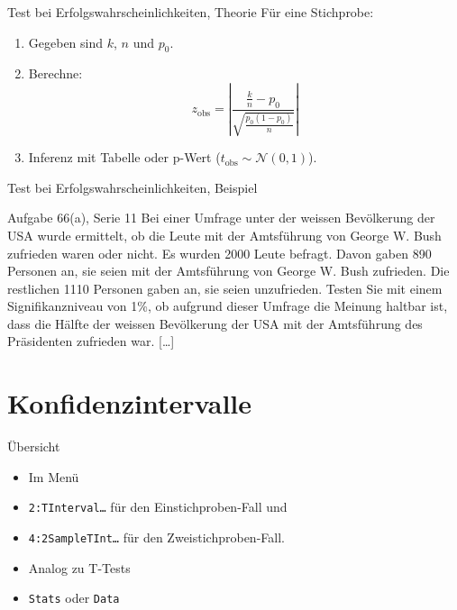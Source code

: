 \documentclass[handout]{beamer}
\newlength{\tikey}
\newcommand{\keystroke}[1]{\settowidth{\tikey}{\scriptsize #1}\psframebox[framearc=0.2]{\parbox{\tikey}{\scriptsize #1}}}
\begin{document}
\begin{frame}{Test bei Erfolgswahrscheinlichkeiten, Theorie}
Für eine Stichprobe:
\begin{enumerate}
\item Gegeben sind $k$, $n$ und $p_0$.
\item Berechne: 
$$
z_\text{obs}=\left| \frac{\frac{k}{n}-p_0}{\sqrt{\frac{p_0(1-p_0)}{n}}}\right|
$$
\item Inferenz mit Tabelle oder p-Wert ($t_\text{obs}\sim\mathcal{N}(0,1)$).
\end{enumerate}
\end{frame}

\begin{frame}{Test bei Erfolgswahrscheinlichkeiten, Beispiel}
\begin{beamerboxesrounded}[shadow]{Aufgabe 66(a), Serie 11}
Bei einer Umfrage unter der weissen Bevölkerung der USA wurde ermittelt, ob
die Leute mit der Amtsführung von George W. Bush zufrieden waren oder nicht.
Es wurden 2000 Leute befragt. Davon gaben 890 Personen an, sie seien mit der
Amtsführung von George W. Bush zufrieden. Die restlichen 1110 Personen gaben an,
sie seien unzufrieden. Testen Sie mit einem Signifikanzniveau von 1\%, ob aufgrund
dieser Umfrage die Meinung haltbar ist, dass die Hälfte der weissen Bevölkerung der
USA mit der Amtsführung des Präsidenten zufrieden war. [\dots]
\end{beamerboxesrounded}
\end{frame}
\section[KI]{Konfidenzintervalle}
\begin{frame}{Übersicht}
\begin{itemize}
\item Im Menü \keystroke{F7}
\item \texttt{2:TInterval\ldots} für den Einstichproben-Fall und
\item \texttt{4:2SampleTInt\ldots} für den Zweistichproben-Fall.
\item Analog zu T-Tests
\item \texttt{Stats} oder \texttt{Data}
\end{itemize}
\end{frame}
\end{document}
